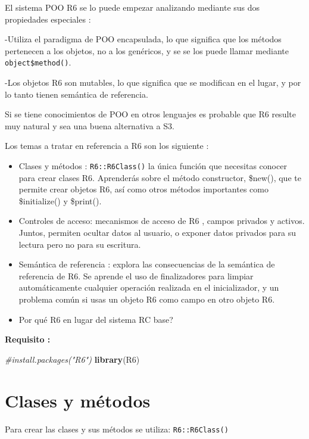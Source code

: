 \documentclass[
]{book}
\newenvironment{Shaded}{\begin{snugshade}}{\end{snugshade}}
\newcommand{\CommentTok}[1]{\textcolor[rgb]{0.56,0.35,0.01}{\textit{#1}}}
\newcommand{\FunctionTok}[1]{\textcolor[rgb]{0.13,0.29,0.53}{\textbf{#1}}}
\newcommand{\NormalTok}[1]{#1}
\begin{document}
El sistema POO R6 se lo puede empezar analizando mediante sus dos propiedades especiales :

-Utiliza el paradigma de POO encapsulada, lo que significa que los métodos pertenecen a los objetos, no a los genéricos, y se se los puede llamar mediante \texttt{object\$method()}.

-Los objetos R6 son mutables, lo que significa que se modifican en el lugar, y por lo tanto tienen semántica de referencia.

Si se tiene conocimientos de POO en otros lenguajes es probable que R6 resulte muy natural y sea una buena alternativa a S3.

Los temas a tratar en referencia a R6 son los siguiente :

\begin{itemize}
\item
  Clases y métodos : \texttt{R6::R6Class()} la única función que necesitas conocer para crear clases R6. Aprenderás sobre el método constructor, \$new(), que te permite crear objetos R6, así como otros métodos importantes como \$initialize() y \$print().
\item
  Controles de acceso: mecanismos de acceso de R6 , campos privados y activos. Juntos, permiten ocultar datos al usuario, o exponer datos privados para su lectura pero no para su escritura.
\item
  Semántica de referencia : explora las consecuencias de la semántica de referencia de R6. Se aprende el uso de finalizadores para limpiar automáticamente cualquier operación realizada en el inicializador, y un problema común si usas un objeto R6 como campo en otro objeto R6.
\item
  Por qué R6 en lugar del sistema RC base?
\end{itemize}

\textbf{Requisito : }

\begin{Shaded}
\begin{Highlighting}[]
\CommentTok{\#install.packages("R6")}
\FunctionTok{library}\NormalTok{(R6)}
\end{Highlighting}
\end{Shaded}

\hypertarget{clases-y-muxe9todos}{%
\section{Clases y métodos}\label{clases-y-muxe9todos}}

Para crear las clases y sus métodos se utiliza: \texttt{R6::R6Class()}
\end{document}
